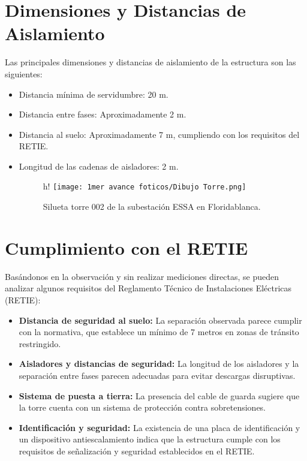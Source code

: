 \section{Dimensiones y Distancias de Aislamiento}

Las principales dimensiones y distancias de aislamiento de la estructura son las siguientes:

\begin{itemize}
    \item Distancia mínima de servidumbre: 20 m.
    \item Distancia entre fases: Aproximadamente 2 m.
    \item Distancia al suelo: Aproximadamente 7 m, cumpliendo con los requisitos del RETIE.
    \item Longitud de las cadenas de aisladores: 2 m.
    

        \begin{figure}{h!}
            \centering
            \texttt{[image: 1mer avance foticos/Dibujo Torre.png]}
            \caption{Silueta torre 002 de la subestación ESSA en Floridablanca.} %
            \label{fig:Torre-Dibujo} %
        \end{figure}
    

\end{itemize}



\section{Cumplimiento con el RETIE}

Basándonos en la observación y sin realizar mediciones directas, se pueden analizar algunos requisitos del Reglamento Técnico de Instalaciones Eléctricas (RETIE):

\begin{itemize}
    \item \textbf{Distancia de seguridad al suelo:} La separación observada parece cumplir con la normativa, que establece un mínimo de 7 metros en zonas de tránsito restringido.
    \item \textbf{Aisladores y distancias de seguridad:} La longitud de los aisladores y la separación entre fases parecen adecuadas para evitar descargas disruptivas.
    \item \textbf{Sistema de puesta a tierra:} La presencia del cable de guarda sugiere que la torre cuenta con un sistema de protección contra sobretensiones.
    \item \textbf{Identificación y seguridad:} La existencia de una placa de identificación y un dispositivo antiescalamiento indica que la estructura cumple con los requisitos de señalización y seguridad establecidos en el RETIE.
\end{itemize}
